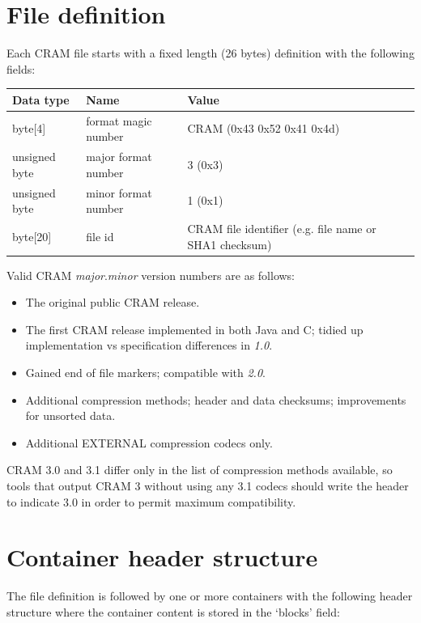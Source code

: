\documentclass[a4paper]{article}
\begin{document}
\section{\textbf{File definition}}

Each CRAM file starts with a fixed length (26 bytes) definition with the following 
fields:

\begin{tabular}{|l|l|l|}
\hline
\textbf{Data type} & \textbf{Name} & \textbf{Value}\tabularnewline
\hline
byte[4] & format magic number & CRAM (0x43 0x52 0x41 0x4d)\tabularnewline
\hline
unsigned byte & major format number & 3 (0x3)\tabularnewline
\hline
unsigned byte & minor format number & 1 (0x1)\tabularnewline
\hline
byte[20] & file id & CRAM file identifier (e.g. file name or SHA1 checksum)\tabularnewline
\hline
\end{tabular}

Valid CRAM \textit{major}.\textit{minor} version numbers are as follows:

\begin{itemize}
\item[\textit{1.0}]
The original public CRAM release.

\item[\textit{2.0}]
The first CRAM release implemented in both Java and C; tidied up
implementation vs specification differences in \textit{1.0}.

\item[\textit{2.1}]
Gained end of file markers; compatible with \textit{2.0}.

\item[\textit{3.0}]
Additional compression methods; header and data checksums;
improvements for unsorted data.

\item[\textit{3.1}]
Additional EXTERNAL compression codecs only.
\end {itemize}

CRAM 3.0 and 3.1 differ only in the list of compression
methods available, so tools that output CRAM 3 without using any 3.1
codecs should write the header to indicate 3.0 in order to permit
maximum compatibility.

\section{\textbf{Container header structure}}
\label{sec:container}

The file definition is followed by one or more containers with the following header 
structure where the container content is stored in the `blocks' field:
\end{document}
